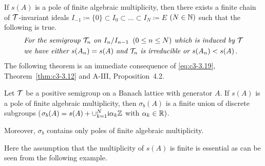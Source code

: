 If $s(A)$ is a pole of finite algebraic multiplicity, then there exists a finite chain of $\mathcal{T}$-invariant ideals $I_{-1} \coloneqq  \{0\} \subset I_{0}\subset ... \subset I_{N} \coloneqq  E$ $(N\in\mathbb{N})$ such that the following is true.
\begin{equation}\label{eq:c3-3.19}
	\begin{aligned}
	&\textit{For the semigroup $\mathcal{T}_{n}$ on $I_{n}/I_{n-1}\, \ (0 \leq n \leq N)$ which is induced by $\mathcal{T}$}
		\\
	& \textit{we have either $s(A_{n}) = s(A)$ and $\mathcal{T}_{n}$ is irreducible or $s(A_{n}) < s(A)$}\,.
	\end{aligned}
\end{equation}
The following theorem is an immediate consequence of \eqref{eq:c3-3.19}, Theorem~\ref{thm:c3-3.12} and A-III, Proposition~4.2.

\begin{theorem}\label{thm:c3-3.14}
	Let $\mathcal{T}$ be a positive semigroup on a Banach lattice with generator $A$. 
	If $s(A)$ is a pole of finite algebraic multiplicity, then $\sigma_{b}(A)$ is a finite union of discrete subgroups (\ie  $\sigma_{b}(A) = s(A) + \cup_{k=1}^{N}\mathrm{i}\alpha_{k}\mathbb{Z}$ with $\alpha_{k} \in \mathbb{R} )$.
	
	Moreover, $\sigma_{b}$ contains only poles of finite algebraic multiplicity.
\end{theorem}

Here the assumption that the multiplicity of $s(A)$ is finite is essential as can be seen from the following example.

